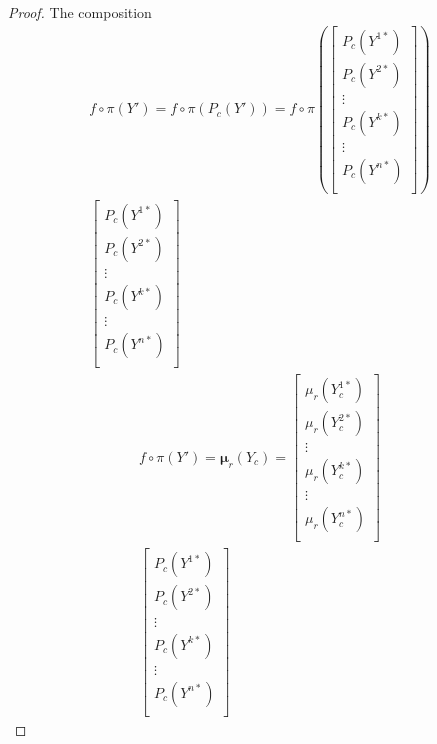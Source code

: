 \begin{appendices}
\begin{proof}
The composition
\begin{align*}
    f \circ \pi (Y') = f \circ \pi ( P_c (Y'))
    =
    f \circ \pi \left(
    \begin{bmatrix}
        P_c(Y^{1\ast})\\
        P_c(Y^{2\ast})\\
        \vdots\\
        P_c(Y^{k\ast})\\
        \vdots\\
        P_c(Y^{n\ast})\\
    \end{bmatrix}
    \right)
    \\
    \begin{bmatrix}
        P_c(Y^{1\ast})\\
        P_c(Y^{2\ast})\\
        \vdots\\
        P_c(Y^{k\ast})\\
        \vdots\\
        P_c(Y^{n\ast})\\
    \end{bmatrix}
\end{align*}
\begin{align*}
    f \circ \pi (Y') = \pmb{\mu}_r (Y_c)
    =
    \begin{bmatrix}
        \mu_r(Y_c^{1\ast})\\
        \mu_r(Y_c^{2\ast})\\
        \vdots\\
        \mu_r(Y_c^{k\ast})\\
        \vdots\\
        \mu_r(Y_c^{n\ast})\\
    \end{bmatrix}
    \\
    \begin{bmatrix}
        P_c(Y^{1\ast})\\
        P_c(Y^{2\ast})\\
        \vdots\\
        P_c(Y^{k\ast})\\
        \vdots\\
        P_c(Y^{n\ast})\\
    \end{bmatrix}
\end{align*}


\end{proof}
\end{appendices}

